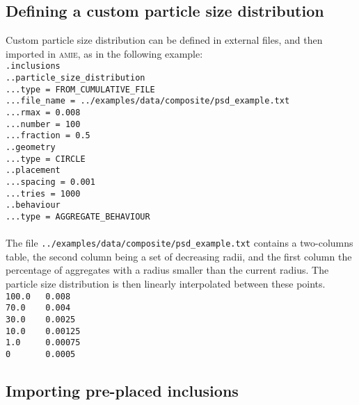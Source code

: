\documentclass[10pt]{article}
\begin{document}
\subsection{Defining a custom particle size distribution}

Custom particle size distribution can be defined in external files, and then imported in \textsc{amie}, as in the following example:\\

\noindent \verb+.inclusions+\\
\verb+..particle_size_distribution+\\
\verb+...type = FROM_CUMULATIVE_FILE+\\
\verb+...file_name = ../examples/data/composite/psd_example.txt+\\
\verb+...rmax = 0.008+\\
\verb+...number = 100+\\
\verb+...fraction = 0.5+\\
\verb+..geometry+\\
\verb+...type = CIRCLE+\\
\verb+..placement+\\
\verb+...spacing = 0.001+\\
\verb+...tries = 1000+\\
\verb+..behaviour+\\
\verb+...type = AGGREGATE_BEHAVIOUR+

\paragraph{}The file \verb+../examples/data/composite/psd_example.txt+ contains a two-columns table, the second column being a set of decreasing radii, and the first column the percentage of aggregates with a radius smaller than the current radius. The particle size distribution is then linearly interpolated between these points.\\


\noindent \verb+100.0   0.008+\\
\verb+70.0    0.004+\\
\verb+30.0    0.0025+\\
\verb+10.0    0.00125+\\
\verb+1.0     0.00075+\\
\verb+0       0.0005+\\

\subsection{Importing pre-placed inclusions}
\end{document}
